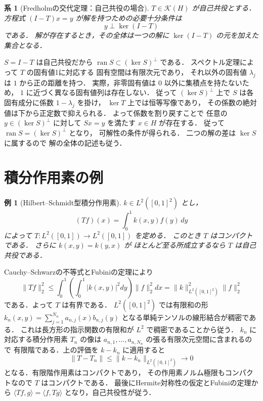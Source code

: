 \documentclass[a5paper,10pt,onecolumn]{jsarticle}
\makeatletter
\theoremstyle{mathnotetheorem}
\newtheorem{corollary}[theorem]{系}
\newtheorem{example}[theorem]{例}
\renewcommand{\proofname}{証明}
\renewenvironment{proof}[1][\proofname]{%
  \par\pushQED{\qed}\normalfont\topsep4\p@\@plus2\p@\relax
  \trivlist\item[\hskip\labelsep\bfseries #1]\ignorespaces
}{\popQED\endtrivlist\@endpefalse}
\newcommand{\norm}[1]{\lVert #1\rVert}
\makeatother
\begin{document}
\begin{corollary}[Fredholmの交代定理：自己共役の場合]
\label{cor:fredholm-sa}
$T\in\mathcal K(H)$ が自己共役とする．
方程式 $(I-T)x=y$ が解を持つための必要十分条件は
\[
 y\perp\ker(I-T)
\]
である．
解が存在するとき，その全体は一つの解に
$\ker(I-T)$ の元を加えた集合となる．
\end{corollary}
\begin{proof}
$S=I-T$ は自己共役だから
$\operatorname{ran}S\subset(\ker S)^\perp$ である．
スペクトル定理によって $T$ の固有値1に対応する
固有空間は有限次元であり，
それ以外の固有値 $\lambda_j$ は $1$ から正の距離を持つ．
実際，非零固有値は $0$ 以外に集積点を持たないため，
$1$ に近づく異なる固有値列は存在しない．
従って $(\ker S)^\perp$ 上で
$S$ は各固有成分に係数 $1-\lambda_j$ を掛け，
$\ker T$ 上では恒等写像であり，
その係数の絶対値は下から正定数で抑えられる．
よって係数を割り戻すことで
任意の $y\in(\ker S)^\perp$ に対して $Sx=y$ を満たす
$x\in H$ が存在する．
従って
$\operatorname{ran}S=(\ker S)^\perp$ となり，
可解性の条件が得られる．
二つの解の差は $\ker S$ に属するので
解の全体の記述も従う．
\end{proof}

\section{積分作用素の例}

\begin{example}[Hilbert--Schmidt型積分作用素]\label{ex:integral}
$k\in L^2([0,1]^2)$ とし，
\[
 (Tf)(x)=\int_0^1k(x,y)f(y)\,dy
\]
によって $T:L^2([0,1])\to L^2([0,1])$ を定める．
このとき $T$ はコンパクトである．
さらに $k(x,y)=\overline{k(y,x)}$ が
ほとんど至る所成立するなら $T$ は自己共役である．
\end{example}
\begin{proof}
Cauchy--Schwarzの不等式とFubiniの定理により
\[
 \norm{Tf}_2^2
 \le\int_0^1\left(\int_0^1|k(x,y)|^2dy\right)\norm f_2^2dx
 =\norm k_{L^2([0,1]^2)}^2\norm f_2^2
\]
である．よって $T$ は有界である．
$L^2([0,1]^2)$ では有限和の形
$k_n(x,y)=\sum_{j=1}^{N_n}a_{n,j}(x)b_{n,j}(y)$
となる単純テンソルの線形結合が稠密である．
これは長方形の指示関数の有限和が
$L^2$ で稠密であることから従う．
$k_n$ に対応する積分作用素 $T_n$ の像は
$a_{n,1},\dots,a_{n,N_n}$ の張る有限次元空間に含まれるので
有限階である．上の評価を $k-k_n$ に適用すると
\[
 \norm{T-T_n}\le\norm{k-k_n}_{L^2([0,1]^2)}\to0
\]
となる．有限階作用素はコンパクトであり，
その作用素ノルム極限もコンパクトなので $T$ はコンパクトである．
最後にHermite対称性の仮定とFubiniの定理から
$\langle Tf,g\rangle=\langle f,Tg\rangle$
となり，自己共役性が従う．
\end{proof}
\end{document}
